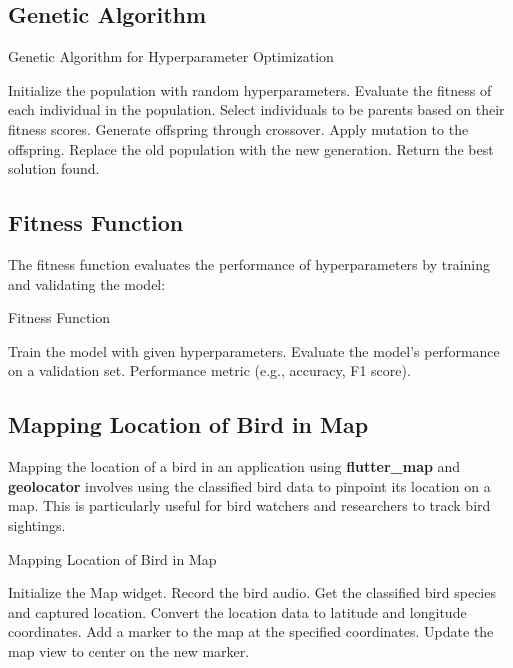 \subsection{Genetic Algorithm}
\begin{algorithm}[H]
    \caption{Genetic Algorithm for Hyperparameter Optimization}
    \begin{algorithmic}[1]
        \STATE Initialize the population with random hyperparameters.
        \STATE Evaluate the fitness of each individual in the population.
        \STATE Select individuals to be parents based on their fitness scores.
        \STATE Generate offspring through crossover.
        \STATE Apply mutation to the offspring.
        \STATE Replace the old population with the new generation.
        \ENDFOR
        \STATE Return the best solution found.
    \end{algorithmic}
\end{algorithm}

\subsection{Fitness Function}
The fitness function evaluates the performance of hyperparameters by training
and validating the model:

\begin{algorithm}[H]
    \caption{Fitness Function}
    \begin{algorithmic}[1]
        \STATE Train the model with given hyperparameters.
        \STATE Evaluate the model's performance on a validation set.
        \RETURN Performance metric (e.g., accuracy, F1 score).
    \end{algorithmic}
\end{algorithm}

\subsection{Mapping Location of Bird in Map}

Mapping the location of a bird in an application using \textbf{flutter\_map} and
\textbf{geolocator} involves using the classified bird data to pinpoint its
location on a map. This is particularly useful for bird watchers and
researchers to track bird sightings.

\begin{algorithm}
    \caption{Mapping Location of Bird in Map}
    \begin{algorithmic}[1]
        \STATE Initialize the Map widget.
        \STATE Record the bird audio.
        \STATE Get the classified bird species and captured location.
        \STATE Convert the location data to latitude and longitude coordinates.
        \STATE Add a marker to the map at the specified coordinates.
        \STATE Update the map view to center on the new marker.
    \end{algorithmic}
\end{algorithm}
\newpage


